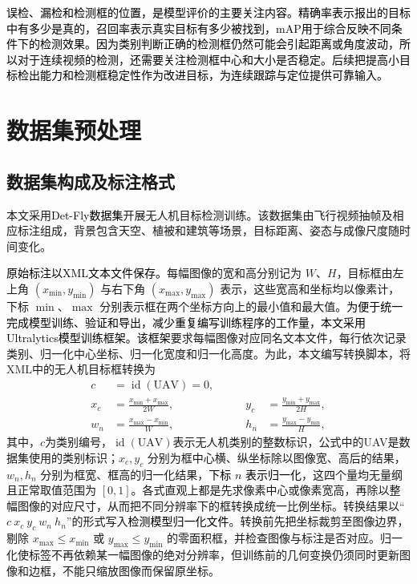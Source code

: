 \textcolor{black}{误检、漏检和检测框的位置，是模型评价的主要关注内容。精确率表示报出的目标中有多少是真的，召回率表示真实目标有多少被找到，mAP用于综合反映不同条件下的检测效果。因为类别判断正确的检测框仍然可能会引起距离或角度波动，所以对于连续视频的检测，还需要关注检测框中心和大小是否稳定。后续把提高小目标检出能力和检测框稳定性作为改进目标，为连续跟踪与定位提供可靠输入。}

\section{数据集预处理}

\subsection{数据集构成及标注格式}

本文采用\textcolor{black}{Det-Fly数据集}开展无人机目标检测训练\cite{detfly}。该数据集由飞行视频抽帧及相应标注组成，背景包含天空、植被和建筑等场景，目标距离、姿态与成像尺度随时间变化。

\textcolor{black}{原始标注以XML文本文件保存。}每幅图像的宽和高分别记为 $W$、$H$，目标框由左上角 $(x_{\min},y_{\min})$ 与右下角 $(x_{\max},y_{\max})$ 表示，这些宽高和坐标均以像素计，下标 $\min$、$\max$ 分别表示框在两个坐标方向上的最小值和最大值。\textcolor{black}{为便于统一完成模型训练、验证和导出，减少重复编写训练程序的工作量，本文采用Ultralytics模型训练框架。该框架}要求每幅图像对应同名文本文件，每行依次记录类别、归一化中心坐标、归一化宽度和归一化高度。为此，本文编写转换脚本，将XML中的无人机目标框转换为
\begin{equation}
\begin{aligned}
c&=\operatorname{id}(\mathrm{UAV})=0,\\
x_c&=\frac{x_{\min}+x_{\max}}{2W},
&\qquad y_c&=\frac{y_{\min}+y_{\max}}{2H},\\
w_n&=\frac{x_{\max}-x_{\min}}{W},
&\qquad h_n&=\frac{y_{\max}-y_{\min}}{H},
\end{aligned}
\label{eq:ch2_voc_yolo}
\end{equation}
其中，$c$为类别编号，$\operatorname{id}(\mathrm{UAV})$表示无人机类别的整数标识，公式中的UAV是数据集使用的类别标识；$x_c,y_c$ 分别为框中心横、纵坐标除以图像宽、高后的结果，$w_n,h_n$ 分别为框宽、框高的归一化结果，\textcolor{black}{下标 $n$ 表示归一化}，这四个量均无量纲且正常取值范围为 $[0,1]$。各式直观上都是先求像素中心或像素宽高，再除以整幅图像的对应尺寸，从而把不同分辨率下的框转换成统一比例坐标。转换结果以“$c\ x_c\ y_c\ w_n\ h_n$”的形式写入\textcolor{black}{检测模型归一化文件}。转换前先把坐标裁剪至图像边界，剔除 $x_{\max}\leq x_{\min}$ 或 $y_{\max}\leq y_{\min}$ 的零面积框，并检查图像与标注是否对应。归一化使标签不再依赖某一幅图像的绝对分辨率，但训练前的几何变换仍须同时更新图像和边框，不能只缩放图像而保留原坐标。


